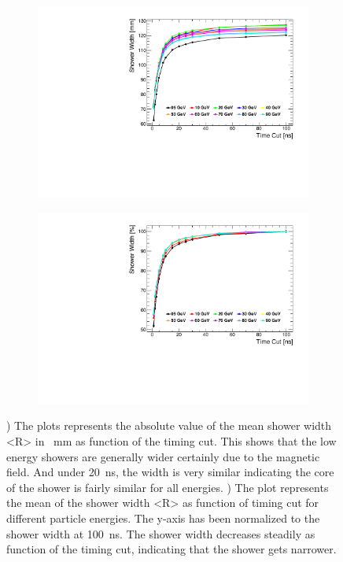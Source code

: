 \begin{figure}[htbp!]
  \centering
  \begin{subfigure}[t]{0.49\textwidth}
    \centering
    \includegraphics[width=1\linewidth]{../Thesis_Plots/ILD/NoSmearing/Plots/ShowerWidthAbso_TimeCuts_noSmearing}
    \caption{} \label{fig:ShowerWidthAbsoNoSmearing}
  \end{subfigure}
  \begin{subfigure}[t]{0.49\textwidth}
    \centering
    \includegraphics[width=1\linewidth]{../Thesis_Plots/ILD/NoSmearing/Plots/ShowerWidth_TimeCuts_noSmearing}
    \caption{} \label{fig:ShowerWidthNoSmearing}
  \end{subfigure}
  \caption{) The plots represents the absolute value of the mean shower width <R> in \SI{}{\milli\meter} as function of the timing cut. This shows that the low energy showers are generally wider certainly due to the magnetic field. And under \SI{20}{\nano\second}, the width is very similar indicating the core of the shower is fairly similar for all energies. ) The plot represents the mean of the shower width <R> as function of timing cut for different particle energies. The y-axis has been normalized to the shower width at \SI{100}{\nano\second}. The shower width decreases steadily as function of the timing cut, indicating that the shower gets narrower.}
\end{figure}

